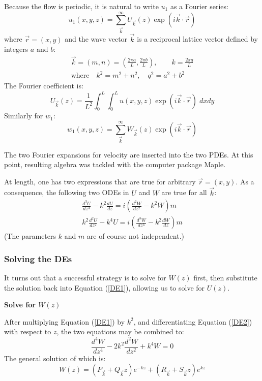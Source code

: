 \documentclass[12pt, a4paper, twoside, openright]{book}
\begin{document}
Because the flow is periodic, it is natural to write $u_1$ as a Fourier series:
\begin{equation}
u_1(x,y,z) = \sum_{\vec{k}}^{\infty} U_{\vec{k}}(z) \exp(i \vec{k}\cdot \vec{r})
\end{equation}
where $\vec{r} = (x,y)$ and the wave vector $\vec{k}$ is a reciprocal lattice vector defined by integers $a$ and $b$:
\begin{gather}
\vec{k} = (m,n) = \left( \frac{ 2\pi a }{L} , \frac{ 2\pi b }{L}  \right),
 \qquad k = \frac{2 \pi q}{L} \\
\text{where} \quad k^2 = m^2 + n^2,  \quad  q^2 = a^2 + b^2
\end{gather}
The Fourier coefficient is:
\begin{equation}
U_{\vec{k}}(z) = \frac{1}{L^2} \int_0^L \int_0^L u(x,y,z) \exp(i \vec{k} \cdot \vec{r})
\;dxdy
\end{equation}
Similarly for $w_1$:
\begin{equation}
w_1(x,y,z) = \sum_{\vec{k}}^{\infty} W_{\vec{k}}(z) \exp(i \vec{k}\cdot \vec{r})
\end{equation}

The two Fourier expansions for velocity are inserted into the two PDEs.  At this point, resulting algebra was tackled with the computer package Maple.

At length, one has two expressions that are true for arbitrary $\vec{r} = (x,y)$.  As a consequence, the following two ODEs in $U$ and $W$ are true for all $\vec{k}$:
\begin{gather}
\frac{d^3 U}{dz^3} - k^2 \frac{d U}{dz} = i \left( \frac{d^2 W}{dz^2} - k^2 W \right) m 
\label{DE1} \\
k^2 \frac{d^2 U}{dz^2} - k^4 U = i \left( \frac{d^3 W}{dz^3} - k^2 \frac{dW}{dz} \right) m
\label{DE2}
\end{gather}
(The parameters $k$ and $m$ are of course not independent.)

\subsubsection{Solving the DEs}

It turns out that a successful strategy is to solve for $W(z)$ first, then substitute the solution back into Equation (\ref{DE1}), allowing us to solve for $U(z)$.

\vspace{1em}
\textbf{Solve for $W(z)$}

After multiplying Equation (\ref{DE1}) by $k^2$, and  differentiating  Equation (\ref{DE2}) with respect to $z$, the two equations may be combined to:
\begin{equation}
\frac{d^4 W}{dz^4} - 2 k^2 \frac{d^2 W}{dz^2} + k^4 W = 0
\end{equation}
The general solution of which is:
\begin{equation}
W(z) = \left( P_{\vec{k}} + Q_{\vec{k}} z \right) e^{-kz} +
\left( R_{\vec{k}} + S_{\vec{k}} z \right) e^{kz}
\end{equation}
\end{document}
